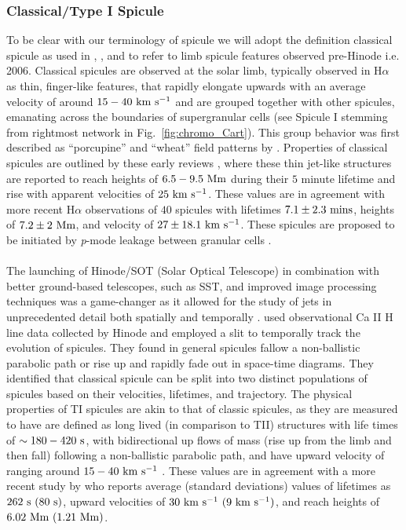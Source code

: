 \documentclass[12pt]{ociamthesis}
\newcommand{\kms}{~\rm{km ~s^{-1}}}
\newcommand{\np}{\\ \\}
\begin{document}
\subsubsection{Classical/Type I Spicule}
\label{subsec:TI}
To be clear with our terminology of spicule we will adopt the definition classical spicule as used in \cite{Sterling2010ApJ7221644S}, \cite{Pereira2013ApJ76469P}, and \cite{Sterling2020ApJ893L45S} to refer to limb spicule features observed pre-Hinode i.e. 2006. Classical spicules are observed at the solar limb, typically observed in H$\alpha$ as thin, finger-like features, that rapidly elongate upwards with an average velocity of around $15-40\kms$ \citep{Pontieu2007PASJ} and are grouped together with other spicules, emanating across the boundaries of supergranular cells (see Spicule I stemming from rightmost network in Fig.~\ref{fig:chromo_Cart}). This group behavior was first described as “porcupine” and “wheat” field patterns by \cite{Lippincott1957SCoA215L}. Properties of classical spicules are outlined by these early reviews \cite{Beckers1968,Beckers1972ARA&A}, where these thin jet-like structures are reported to reach heights of $6.5-9.5~\rm{Mm}$ during their $5$ minute lifetime and rise with apparent velocities of $25\kms$. These values are in agreement with more recent H$\alpha$ observations of $40$ spicules with lifetimes $7.1\pm2.3~\rm{mins}$, heights of $7.2\pm2~\rm{Mm}$, and velocity of $27\pm18.1\kms$. These spicules are proposed to be initiated by \textit{p}-mode leakage between granular cells \citep{Pontieu2004Natur}. \np
%
The launching of Hinode/SOT (Solar Optical Telescope) in combination with better ground-based telescopes, such as SST, and improved image processing techniques was a game-changer as it allowed for the study of jets in unprecedented detail both spatially and temporally \citep{Aschwanden2010SoPh262235A}. \cite{Pontieu2007PASJ} used observational Ca II H line data collected by Hinode and employed a slit to temporally track the evolution of spicules. They found in general spicules fallow a non-ballistic parabolic path or rise up and rapidly fade out in space-time diagrams. They identified that classical spicule can be split into two distinct populations of spicules based on their velocities, lifetimes, and trajectory. The physical properties of TI spicules are akin to that of classic spicules, as they are measured to have are defined as long lived (in comparison to TII) structures with life times of $\sim 180-420~\rm{s}$, with bidirectional up flows of mass (rise up from the limb and then fall) following a non-ballistic parabolic path, and have upward velocity of ranging around $15-40\kms$ \citep{Pontieu2007PASJ}. These values are in agreement with a more recent study by \cite{Pereira2012} who reports average (standard deviations) values of lifetimes as $262~\rm{s}~(80~\rm{s})$, upward velocities of $30\kms~(9\kms)$, and reach heights of $6.02~\rm{Mm}~(1.21~\rm{Mm})$. \np
\end{document}
